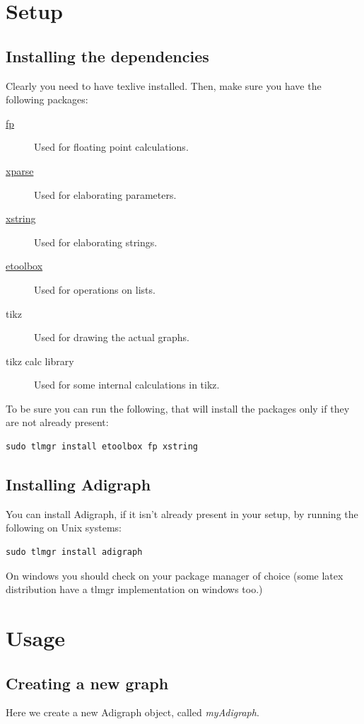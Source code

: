 \documentclass{report}
\begin{document}
\chapter{Setup}
\section{Installing the dependencies}
Clearly you need to have texlive installed. Then, make sure you have the following packages:

\begin{description}
	\item[\href{https://ctan.org/pkg/fp}{fp}] Used for floating point calculations.
	\item[\href{https://ctan.org/pkg/xparse}{xparse}] Used for elaborating parameters.
	\item[\href{https://ctan.org/pkg/xstring}{xstring}] Used for elaborating strings.
	\item[\href{https://ctan.org/pkg/etoolbox}{etoolbox}] Used for operations on lists.
	\item[tikz] Used for drawing the actual graphs.
	\item[tikz calc library] Used for some internal calculations in tikz.
\end{description}

To be sure you can run the following, that will install the packages only if they are not already present:

\begin{verbatim}
sudo tlmgr install etoolbox fp xstring
\end{verbatim}

\section{Installing Adigraph}
You can install Adigraph, if it isn't already present in your setup, by running the following on Unix systems:

\begin{verbatim}
sudo tlmgr install adigraph
\end{verbatim}

On windows you should check on your package manager of choice (some latex distribution have a tlmgr implementation on windows too.)

\chapter{Usage}
\section{Creating a new graph}
Here we create a new Adigraph object, called \textit{myAdigraph}.
\end{document}
